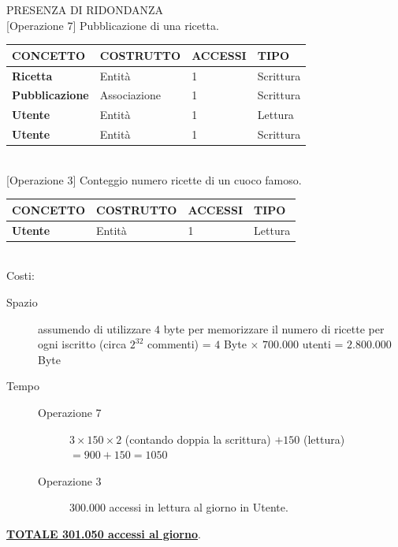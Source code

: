 \documentclass[12pt]{extarticle}
\begin{document}
\newpage




\begin{center}
    \large{PRESENZA DI RIDONDANZA}\\
    \vspace{0.5cm}
    \normalsize{[Operazione 7] Pubblicazione di una ricetta.}\\
    \vspace{0.5cm}
    \begin{tabularx}{\textwidth}{X|X|X|X}
        \bfseries CONCETTO    & \bfseries COSTRUTTO     & \bfseries ACCESSI & \bfseries TIPO\\ 
        \hline\hline
        \bfseries Ricetta           & Entità         & 1       &   Scrittura    \\ 
        \hline
        \bfseries Pubblicazione     & Associazione   & 1       &   Scrittura    \\ 
        \hline
        \bfseries Utente            & Entità         & 1       &   Lettura    \\ 
        \hline
        \bfseries Utente            & Entità         & 1       &   Scrittura    \\ 
        \hline
    \end{tabularx}
    \\
    \vspace{1cm}
    \normalsize{[Operazione 3] Conteggio numero ricette di un cuoco famoso.}\\
    \vspace{0.5cm}
    \begin{tabularx}{\textwidth}{X|X|X|X}
        \bfseries CONCETTO    & \bfseries COSTRUTTO     & \bfseries ACCESSI & \bfseries TIPO\\ 
        \hline\hline
        \bfseries Utente            & Entità         & 1       &   Lettura    \\ 
        \hline
    \end{tabularx}
        \\
        \vspace{0.5cm} 
        Costi:
\end{center}

\begin{description}
    \item[Spazio] assumendo di utilizzare $4$ byte per memorizzare il numero di ricette per
    ogni iscritto (circa $2^{32}$ commenti) = $4$ Byte $\times$ $700.000$ utenti = $2.800.000$ Byte
    \item[Tempo] \hfill
    \begin{description}
        \item [Operazione 7] $3 \times 150 \times 2$ (contando doppia la scrittura) $+ 150$ (lettura) $= 900 + 150 = 1050$
        \item [Operazione 3] 300.000 accessi in lettura al giorno in Utente.
    \end{description}  
\end{description}
\begin{center}
\uline{\bfseries{TOTALE 301.050 accessi al giorno}}.
\end{center}
\end{document}
